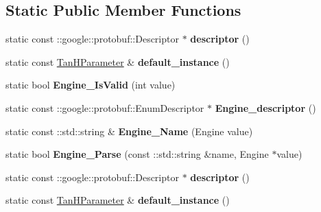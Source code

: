 \subsection*{Static Public Member Functions}
\begin{DoxyCompactItemize}
\item 
\mbox{\label{classcaffe_1_1_tan_h_parameter_ae74ba57e8efd6a3a9e5f499504e71b09}} 
static const \+::google\+::protobuf\+::\+Descriptor $\ast$ {\bfseries descriptor} ()
\item 
\mbox{\label{classcaffe_1_1_tan_h_parameter_aafeaec88e510cd8db5733af7169b44f0}} 
static const \mbox{\hyperlink{classcaffe_1_1_tan_h_parameter}{Tan\+H\+Parameter}} \& {\bfseries default\+\_\+instance} ()
\item 
\mbox{\label{classcaffe_1_1_tan_h_parameter_a0563ba905800a4f4df64de7760dd0c97}} 
static bool {\bfseries Engine\+\_\+\+Is\+Valid} (int value)
\item 
\mbox{\label{classcaffe_1_1_tan_h_parameter_ada335064ab8d07aed7c254cc20544399}} 
static const \+::google\+::protobuf\+::\+Enum\+Descriptor $\ast$ {\bfseries Engine\+\_\+descriptor} ()
\item 
\mbox{\label{classcaffe_1_1_tan_h_parameter_a70c86f00fd3b7f0a3b71e3a9979ed606}} 
static const \+::std\+::string \& {\bfseries Engine\+\_\+\+Name} (Engine value)
\item 
\mbox{\label{classcaffe_1_1_tan_h_parameter_a6c234f43ee74fde5881e700e3e101ab7}} 
static bool {\bfseries Engine\+\_\+\+Parse} (const \+::std\+::string \&name, Engine $\ast$value)
\item 
\mbox{\label{classcaffe_1_1_tan_h_parameter_a4d0f17cf75996f6e7b7eadee6bd524d2}} 
static const \+::google\+::protobuf\+::\+Descriptor $\ast$ {\bfseries descriptor} ()
\item 
\mbox{\label{classcaffe_1_1_tan_h_parameter_a1e2541b05a508f494396ac45d14c340a}} 
static const \mbox{\hyperlink{classcaffe_1_1_tan_h_parameter}{Tan\+H\+Parameter}} \& {\bfseries default\+\_\+instance} ()

\end{DoxyCompactItemize}
